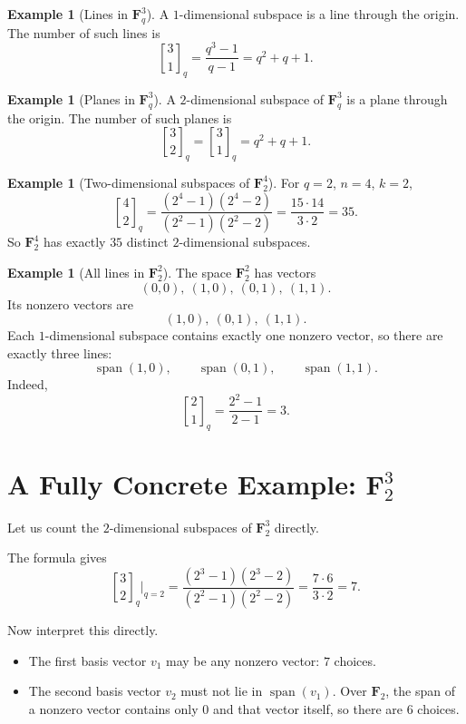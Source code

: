 \documentclass[11pt]{article}
\theoremstyle{definition}
\newtheorem{example}[theorem]{Example}
\theoremstyle{remark}
\newcommand{\F}{\mathbf{F}}
\newcommand{\Span}{\operatorname{span}}
\newcommand{\qbinom}[2]{\genfrac{[}{]}{0pt}{}{#1}{#2}_q}
\begin{document}
	\begin{example}[Lines in \(\F_q^3\)]
		A \(1\)-dimensional subspace is a line through the origin. The number of such lines is
		\[
		\qbinom{3}{1}
		=
		\frac{q^3-1}{q-1}
		=
		q^2+q+1.
		\]
	\end{example}
	
	\begin{example}[Planes in \(\F_q^3\)]
		A \(2\)-dimensional subspace of \(\F_q^3\) is a plane through the origin. The number of such planes is
		\[
		\qbinom{3}{2}
		=
		\qbinom{3}{1}
		=
		q^2+q+1.
		\]
	\end{example}
	
	\begin{example}[Two-dimensional subspaces of \(\F_2^4\)]
		For \(q=2\), \(n=4\), \(k=2\),
		\[
		\qbinom{4}{2}
		=
		\frac{(2^4-1)(2^4-2)}{(2^2-1)(2^2-2)}
		=
		\frac{15\cdot 14}{3\cdot 2}
		=
		35.
		\]
		So \(\F_2^4\) has exactly \(35\) distinct \(2\)-dimensional subspaces.
	\end{example}
	
	\begin{example}[All lines in \(\F_2^2\)]
		The space \(\F_2^2\) has vectors
		\[
		(0,0),\ (1,0),\ (0,1),\ (1,1).
		\]
		Its nonzero vectors are
		\[
		(1,0),\ (0,1),\ (1,1).
		\]
		Each \(1\)-dimensional subspace contains exactly one nonzero vector, so there are exactly three lines:
		\[
		\Span(1,0),\qquad
		\Span(0,1),\qquad
		\Span(1,1).
		\]
		Indeed,
		\[
		\qbinom{2}{1}=\frac{2^2-1}{2-1}=3.
		\]
	\end{example}
	
	\section{A Fully Concrete Example: \(\F_2^3\)}
	
	Let us count the \(2\)-dimensional subspaces of \(\F_2^3\) directly.
	
	The formula gives
	\[
	\qbinom{3}{2}\Big|_{q=2}
	=
	\frac{(2^3-1)(2^3-2)}{(2^2-1)(2^2-2)}
	=
	\frac{7\cdot 6}{3\cdot 2}
	=
	7.
	\]
	
	Now interpret this directly.
	
	\begin{itemize}
		\item The first basis vector \(v_1\) may be any nonzero vector: \(7\) choices.
		\item The second basis vector \(v_2\) must not lie in \(\Span(v_1)\). Over \(\F_2\), the span of a nonzero vector contains only \(0\) and that vector itself, so there are \(6\) choices.
	\end{itemize}
	
\end{document}
